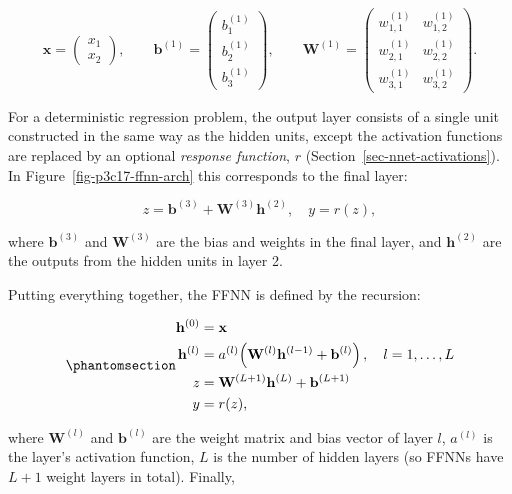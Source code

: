 \documentclass[
  letterpaper,
  krantz2]{style/krantz}
\begin{document}
\[
\mathbf{x}=
\begin{pmatrix} x_1 \\ x_2 \end{pmatrix},
\qquad
\mathbf{b}^{(1)} =
\begin{pmatrix} b_1^{(1)} \\ b_2^{(1)} \\ b_3^{(1)} \end{pmatrix},
\qquad
\mathbf{W}^{(1)} =
\begin{pmatrix}
w_{1,1}^{(1)} & w_{1,2}^{(1)} \\
w_{2,1}^{(1)} & w_{2,2}^{(1)} \\
w_{3,1}^{(1)} & w_{3,2}^{(1)}
\end{pmatrix}.
\]

For a deterministic regression problem,
the output layer consists of a single unit constructed in the same way
as the hidden units, except the activation functions are replaced by an
optional \emph{response
function}, \(r\)
(Section~\ref{sec-nnet-activations}). In
Figure~\ref{fig-p3c17-ffnn-arch} this corresponds to the final layer:

\[
z = \mathbf{b}^{(3)} + \mathbf{W}^{(3)} \mathbf{h}^{(2)}, \quad y = r(z),
\]

where \(\mathbf{b}^{(3)}\) and \(\mathbf{W}^{(3)}\) are the bias and
weights in the final layer, and \(\mathbf{h}^{(2)}\) are the outputs
from the hidden units in layer 2.

Putting everything together, the FFNN is defined by the recursion:

\begin{equation}\phantomsection\label{eq-nnet-forward}{
\begin{aligned}
\mathbf{h}^{(0)} &= \mathbf{x}\\
\mathbf{h}^{(l)} &= a^{(l)}\!\left(\mathbf{W}^{(l)}\mathbf{h}^{(l-1)} + \mathbf{b}^{(l)}\right), \quad l = 1, \ldots, L \\
z &= \mathbf{W}^{(L+1)}\mathbf{h}^{(L)} + \mathbf{b}^{(L+1)} \\
y &= r(z),
\end{aligned}
}\end{equation}

where \(\mathbf{W}^{(l)}\) and \(\mathbf{b}^{(l)}\) are the weight
matrix and bias vector of layer \(l\), \(a^{(l)}\) is the layer's
activation function, \(L\) is the number of hidden layers (so FFNNs have
\(L+1\) weight layers in total). Finally,
\end{document}

